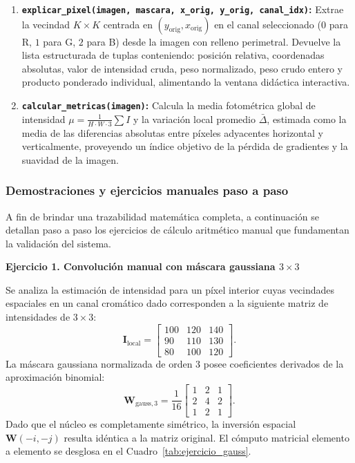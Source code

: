 \documentclass[11pt]{article}
\begin{document}
\begin{enumerate}[itemsep=0.3em]
\item \textbf{\texttt{explicar\_pixel(imagen, mascara, x\_orig, y\_orig, canal\_idx)}:}
Extrae la vecindad $K \times K$ centrada en $(y_{\text{orig}}, x_{\text{orig}})$ en el canal seleccionado ($0$ para R, $1$ para G, $2$ para B) desde la imagen con relleno perimetral. Devuelve la lista estructurada de tuplas conteniendo: posición relativa, coordenadas absolutas, valor de intensidad cruda, peso normalizado, peso crudo entero y producto ponderado individual, alimentando la ventana didáctica interactiva.

\item \textbf{\texttt{calcular\_metricas(imagen)}:}
Calcula la media fotométrica global de intensidad $\mu = \frac{1}{H\cdot W \cdot 3} \sum I$ y la variación local promedio $\bar{\Delta}$, estimada como la media de las diferencias absolutas entre píxeles adyacentes horizontal y verticalmente, proveyendo un índice objetivo de la pérdida de gradientes y la suavidad de la imagen.
\end{enumerate}

\subsubsection{Demostraciones y ejercicios manuales paso a paso}

A fin de brindar una trazabilidad matemática completa, a continuación se detallan paso a paso los ejercicios de cálculo aritmético manual que fundamentan la validación del sistema.

\textbf{Ejercicio 1. Convolución manual con máscara gaussiana $3\times3$}

Se analiza la estimación de intensidad para un píxel interior cuyas vecindades espaciales en un canal cromático dado corresponden a la siguiente matriz de intensidades de $3\times3$:
\begin{equation}
\mathbf{I}_{\text{local}} = \begin{bmatrix}
100 & 120 & 140 \\
90 & 110 & 130 \\
80 & 100 & 120
\end{bmatrix}.
\end{equation}
La máscara gaussiana normalizada de orden 3 posee coeficientes derivados de la aproximación binomial:
\begin{equation}
\mathbf{W}_{\text{gauss}, 3} = \frac{1}{16} \begin{bmatrix}
1 & 2 & 1 \\
2 & 4 & 2 \\
1 & 2 & 1
\end{bmatrix}.
\end{equation}
Dado que el núcleo es completamente simétrico, la inversión espacial $\mathbf{W}(-i, -j)$ resulta idéntica a la matriz original. El cómputo matricial elemento a elemento se desglosa en el Cuadro~\ref{tab:ejercicio_gauss}.
\end{document}
